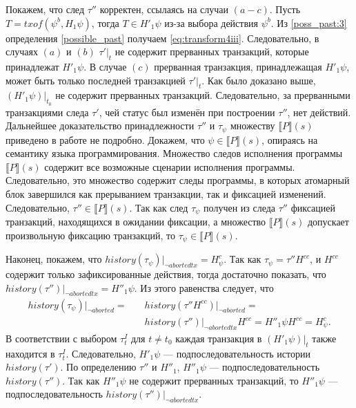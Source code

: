 \begin{myproof}
Покажем, что след $\tau''$ корректен, ссылаясь на случаи $(a-c)$. Пусть $T = txof(\psi^b, H_1\psi)$, тогда $T \in H'_1\psi$ из-за выбора действия $\psi^b$. Из \ref{poss_past:3} определения \ref{possible_past} получаем \eqref{eq:transform4iii}. Следовательно, в случаях $(a)$ и $(b)$ $\tau'|_t$ не содержит прерванных транзакций, которые принадлежат $H'_1\psi$. В случае $(c)$ прерванная транзакция, принадлежащая $H'_1\psi$, может быть только последней транзакцией $\tau'|_t$. Как было доказано выше, $(H'_1\psi)|_{t_0}$ не содержит прерванных транзакций. Следовательно, за прерванными транзакциями следа $\tau'$, чей статус был изменён при построении $\tau''$, нет действий. Дальнейшее доказательство принадлежности $\tau''$ и $\tau_{\psi}$ множеству  $\llbracket P\rrbracket(s)$ приведено в работе \cite{tms_article} не подробно. Докажем, что $\psi \in \llbracket P\rrbracket(s)$, опираясь на семантику языка программирования. Множество следов исполнения программы $\llbracket P\rrbracket(s)$ содержит все возможные сценарии исполнения программы. Следовательно, это множество содержит следы программы, в которых атомарный блок завершился как прерыванием транзакции, так и фиксацией изменений. Следовательно, $\tau'' \in \llbracket P\rrbracket(s)$. Так как след $\tau_{\psi}$ получен из следа $\tau''$ фиксацией транзакций, находящихся в ожидании фиксации, а множество $\llbracket P\rrbracket(s)$ допускает произвольную фиксацию транзакций, то  $\tau_{\psi} \in \llbracket P\rrbracket(s)$.

Наконец, покажем, что $history(\tau_{\psi})|_{\neg abortedtx} = H^c_{\psi}$. Так как $\tau_{\psi} = \tau''H^{cc}$, и $H^{cc}$ содержит только зафиксированные действия, тогда достаточно показать, что $history(\tau'')|_{\neg abortedtx} = H''_1\psi$. Из этого равенства следует, что
\begin{align*}
history(\tau_{\psi})|_{\neg aborted} = &\quad history(\tau''H^{cc})|_{\neg aborted} = \\
                                 &\quad history(\tau'')|_{\neg abortedtx}H^{cc} = H''_1{\psi}H^{cc} =H^c_{\psi}.
\end{align*}
В соответствии с выбором $\tau^I_t$ для $t \neq t_0$ каждая транзакция в $(H'_1\psi)|_t$ также находится в $\tau^I_t$. Следовательно, $H'_1\psi$ --- подпоследовательность истории $history(\tau')$. По определению $\tau''$ и $H''_1$, $H''_1\psi$ --- подпоследовательность $history(\tau'')$. Так как $H''_1\psi$ не содержит прерванных транзакций, то $H''_1\psi$ --- подпоследовательность $history(\tau'')|_{\neg abortedtx}$.


\end{myproof}
